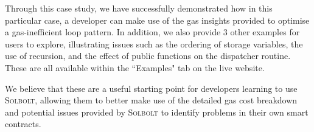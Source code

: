 Through this case study, we have successfully demonstrated how in this particular case,
a developer can make use of the gas insights provided to optimise a gas-inefficient
loop pattern. In addition, we also provide 3 other examples for users to explore,
illustrating issues such as the ordering of storage variables, the use of recursion,
and the effect of public functions on the dispatcher routine. These are all available
within the ``Examples" tab on the live website. 

We believe that these are a useful
starting point for developers learning to use \textcolor{NavyBlue}{\textsc{Solbolt}},
allowing them to better make use of the detailed gas cost breakdown and potential
issues provided by \textcolor{NavyBlue}{\textsc{Solbolt}} to identify problems in their own smart contracts.